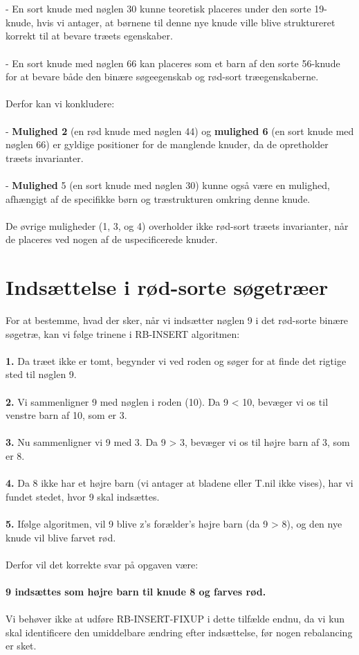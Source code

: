 \documentclass{article}
\begin{document}
\\
\\
- En sort knude med nøglen 30 kunne teoretisk placeres under den sorte 19-knude, hvis vi antager, at børnene til denne nye knude ville blive struktureret korrekt til at bevare træets egenskaber.
\\
\\
- En sort knude med nøglen 66 kan placeres som et barn af den sorte 56-knude for at bevare både den binære søgeegenskab og rød-sort træegenskaberne.
\\
\\
Derfor kan vi konkludere:
\\
\\
- \textbf{Mulighed 2} (en rød knude med nøglen 44) og\textbf{ mulighed 6} (en sort knude med nøglen 66) er gyldige positioner for de manglende knuder, da de opretholder træets invarianter.
\\
\\
- \textbf{Mulighed }5 (en sort knude med nøglen 30) kunne også være en mulighed, afhængigt af de specifikke børn og træstrukturen omkring denne knude.
\\
\\
De øvrige muligheder (1, 3, og 4) overholder ikke rød-sort træets invarianter, når de placeres ved nogen af de uspecificerede knuder.

\section{Indsættelse i rød-sorte søgetræer}
For at bestemme, hvad der sker, når vi indsætter nøglen 9 i det rød-sorte binære søgetræ, kan vi følge trinene i RB-INSERT algoritmen:
\\
\\
\textbf{1. }Da træet ikke er tomt, begynder vi ved roden og søger for at finde det rigtige sted til nøglen 9.
\\
\\
\textbf{2. }Vi sammenligner 9 med nøglen i roden (10). Da 9 < 10, bevæger vi os til venstre barn af 10, som er 3.
\\
\\
\textbf{3. }Nu sammenligner vi 9 med 3. Da 9 > 3, bevæger vi os til højre barn af 3, som er 8.
\\
\\
\textbf{4. }Da 8 ikke har et højre barn (vi antager at bladene eller T.nil ikke vises), har vi fundet stedet, hvor 9 skal indsættes.
\\
\\
\textbf{5. }Ifølge algoritmen, vil 9 blive z's forælder's højre barn (da 9 > 8), og den nye knude vil blive farvet rød.
\\
\\
Derfor vil det korrekte svar på opgaven være:
\\
\\
\textbf{9 indsættes som højre barn til knude 8 og farves rød.}
\\
\\
Vi behøver ikke at udføre RB-INSERT-FIXUP i dette tilfælde endnu, da vi kun skal identificere den umiddelbare ændring efter indsættelse, før nogen rebalancing er sket.
\end{document}

